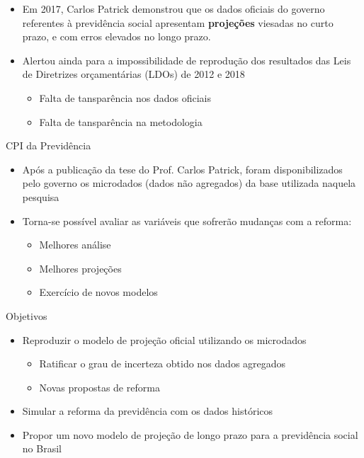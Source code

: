\begin{frame}
  \begin{block}{}
    \begin{itemize}
      \item Em 2017, Carlos Patrick \cite{patrick} demonstrou que os dados
      oficiais do governo referentes à previdência social apresentam
      \textbf{projeções} \alert{viesadas no curto prazo}, e com \alert{erros
elevados no longo prazo}.
      \item Alertou ainda para a \alert{impossibilidade de reprodução dos
resultados} das Leis de Diretrizes orçamentárias (LDOs) de 2012 e 2018
      \begin{itemize}
        \item Falta de tansparência nos dados oficiais
        \item Falta de tansparência na metodologia
      \end{itemize}
    \end{itemize}
  \end{block}
\end{frame}

\begin{frame}
  \begin{block}{CPI da Previdência}
    \begin{itemize}
      \item Após a publicação da tese do Prof. Carlos Patrick, foram
      disponibilizados pelo governo os microdados (dados não agregados) da base
      utilizada naquela pesquisa
      \item Torna-se possível avaliar as variáveis que sofrerão mudanças com a
      reforma:
      \begin{itemize}
        \item  Melhores análise
        \item  Melhores projeções
        \item  Exercício de novos modelos
      \end{itemize}
    \end{itemize}
  \end{block}
\end{frame}

\begin{frame}
  \begin{block}{Objetivos}
    \begin{itemize}
      \item Reproduzir o modelo de projeção oficial utilizando os microdados
      \begin{itemize}
        \item Ratificar o grau de incerteza obtido nos dados agregados
        \item \alert{Novas propostas de reforma}
      \end{itemize}
      \item Simular a reforma da previdência com os dados históricos
      \item Propor um novo modelo de projeção de longo prazo para a previdência
      social no Brasil
    \end{itemize}
  \end{block}
\end{frame}

